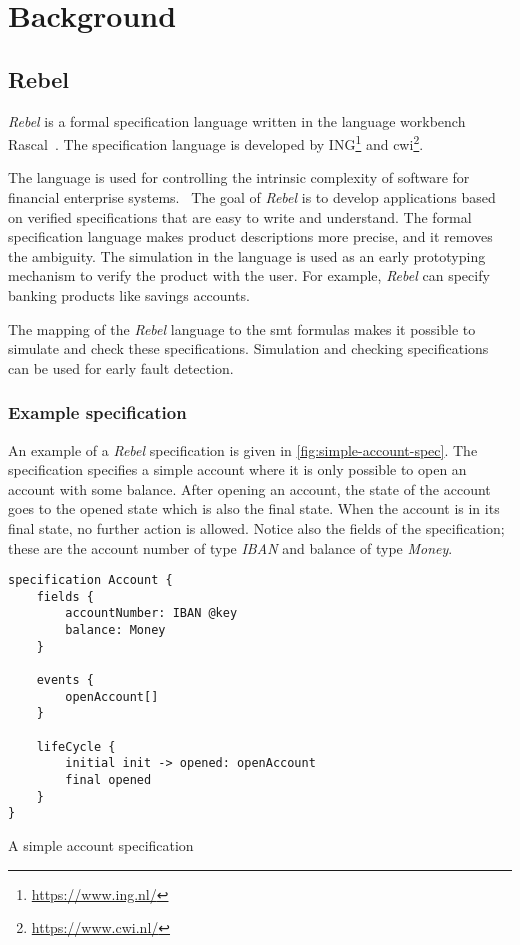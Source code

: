 \chapter{Background}\label{sec:ch2}

\section{Rebel}

\textit{Rebel} is a formal specification language written in the language
workbench Rascal~\cite{RascalGTTSE}. The specification language is developed by
ING\footnote{\url{https://www.ing.nl/}} and
\gls{cwi}\footnote{\url{https://www.cwi.nl/}}.

The language is used for controlling the intrinsic complexity of software for
financial enterprise systems.~\cite[p.~1]{stoel_storm_vinju_bosman_2016} The
goal of \textit{Rebel} is to develop applications based on verified
specifications that are easy to write and understand.
The formal specification language makes product descriptions more precise, and
it removes the ambiguity. The simulation in the language is used as an early
prototyping mechanism to verify the product with the user. For example,
\textit{Rebel} can specify banking products like savings accounts.

The mapping of the \textit{Rebel} language to the \gls{smt} formulas makes it
possible to simulate and check these specifications. Simulation and checking
specifications can be used for early fault detection.

\subsection{Example specification}
An example of a \textit{Rebel} specification is given in
\autoref{fig:simple-account-spec}. The specification specifies a simple account
where it is only possible to open an account with some balance. After opening an
account, the state of the account goes to the opened state which is also the
final state. When the account is in its final state, no further action is
allowed. Notice also the fields of the specification; these are the account
number of type \textit{IBAN} and balance of type \textit{Money}.

\begin{sourcecode}[h!]
\begin{lstlisting}[]
specification Account {
	fields {
		accountNumber: IBAN @key
		balance: Money
	}

	events {
		openAccount[]
	}

	lifeCycle {
		initial init -> opened: openAccount
		final opened
	}
}
\end{lstlisting}
\caption{A simple account specification}\label{fig:simple-account-spec}
\end{sourcecode}
\FloatBarrier

